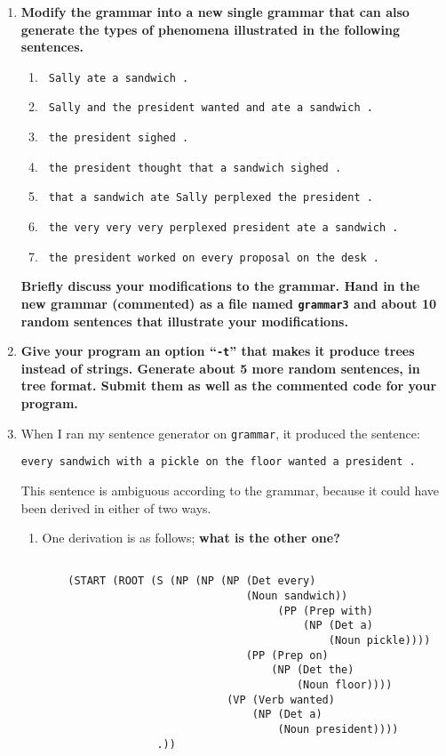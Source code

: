 \documentclass[10pt]{article}
\begin{document}
\begin{enumerate}
\begin{enumerate}
\end{enumerate}
\item {\bf Modify the grammar into a new single grammar that can also generate the types of
  phenomena illustrated in the following sentences.}
\begin{enumerate}
\item \verb| Sally ate a sandwich .|
\item \verb| Sally and the president wanted and ate a sandwich .|
\item \verb| the president sighed .|
\item \verb| the president thought that a sandwich sighed .|
\item \verb| that a sandwich ate Sally perplexed the president .|
\item \verb| the very very very perplexed president ate a sandwich .|
\item \verb| the president worked on every proposal on the desk .|
\end{enumerate}

\noindent
{\bf Briefly discuss your modifications to the grammar. Hand
  in the new grammar (commented) as a file named \verb|grammar3| and about 10
  random sentences that illustrate your modifications.}

\item {\bf Give your program an option ``\verb|-t|'' that makes it produce
  trees instead of strings. Generate about 5 more random
sentences, in tree format. Submit them as well as the commented code
for your program.} 

\item When I ran my sentence generator on \verb|grammar|, it produced
  the sentence:
\begin{verbatim}
every sandwich with a pickle on the floor wanted a president .
\end{verbatim}
\noindent
This sentence is ambiguous according to the grammar, because it could
have been derived in either of two ways.
\begin{enumerate}
\item  One derivation is as follows; {\bf what is the other one?}

\bigskip
\begin{verbatim}

    (START (ROOT (S (NP (NP (NP (Det every)
                                (Noun sandwich))
                                     (PP (Prep with)
                                         (NP (Det a)
                                             (Noun pickle))))
                                (PP (Prep on)
                                    (NP (Det the)
                                        (Noun floor))))
                             (VP (Verb wanted)
                                 (NP (Det a)
                                     (Noun president))))
                  .))
\end{verbatim}


\end{enumerate}
\end{enumerate}
\end{document}
